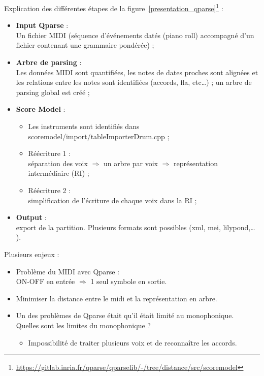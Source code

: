 Explication des différentes étapes 
de la figure~\ref{presentation_qparse}\footnote{\url{https://gitlab.inria.fr/qparse/qparselib/-/tree/distance/src/scoremodel}} :
\begin{itemize}
	\item \textbf{Input Qparse} :\\
	Un fichier MIDI (séquence d’événements datés (piano roll) accompagné d’un fichier contenant une grammaire pondérée) ;
	\item \textbf{Arbre de parsing} :\\
	Les données MIDI sont quantifiées, les notes de dates proches sont alignées et les relations entre les notes sont identifiées (accords, fla, etc…) ; un arbre de parsing global est créé ;
	\item \textbf{Score Model} :
	\begin{itemize}
		\item Les instruments sont identifiés dans scoremodel/import/tableImporterDrum.cpp ;
		\item Réécriture 1 :\\
		séparation des voix $\Rightarrow$ un arbre par voix $\Rightarrow$ représentation intermédiaire (RI) ;
		\item Réécriture 2 :\\
		simplification de l’écriture de chaque voix dans la RI ;
	\end{itemize}
    \item \textbf{Output} :\\
    export de la partition. Plusieurs formats sont possibles (xml, mei, lilypond,… ).\\
\end{itemize}
Plusieurs enjeux :
\begin{itemize}
	\item Problème du MIDI avec Qparse :\\
	ON-OFF en entrée $\Rightarrow$ 1 seul symbole en sortie.
	\item Minimiser la distance entre le midi et la représentation en arbre.
	\item Un des problèmes de Qparse était qu’il était limité au monophonique.\\
	Quelles sont les limites du monophonique ?
	\begin{itemize}
		\item Impossibilité de traiter plusieurs voix et de reconnaître les accords.
	\end{itemize}
\end{itemize}


